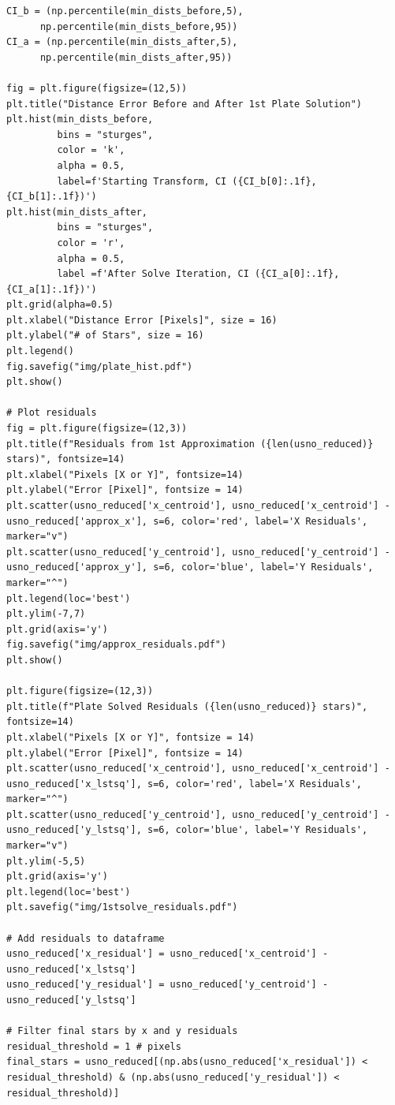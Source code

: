 \documentclass{article}
\begin{document}
\begin{appendices}
\begin{small}
\begin{verbatim}
CI_b = (np.percentile(min_dists_before,5), 
      np.percentile(min_dists_before,95))
CI_a = (np.percentile(min_dists_after,5), 
      np.percentile(min_dists_after,95))

fig = plt.figure(figsize=(12,5))
plt.title("Distance Error Before and After 1st Plate Solution")
plt.hist(min_dists_before, 
         bins = "sturges", 
         color = 'k',
         alpha = 0.5, 
         label=f'Starting Transform, CI ({CI_b[0]:.1f},{CI_b[1]:.1f})')
plt.hist(min_dists_after, 
         bins = "sturges", 
         color = 'r',
         alpha = 0.5, 
         label =f'After Solve Iteration, CI ({CI_a[0]:.1f},{CI_a[1]:.1f})')
plt.grid(alpha=0.5)
plt.xlabel("Distance Error [Pixels]", size = 16)
plt.ylabel("# of Stars", size = 16)
plt.legend()
fig.savefig("img/plate_hist.pdf")
plt.show()

# Plot residuals
fig = plt.figure(figsize=(12,3))
plt.title(f"Residuals from 1st Approximation ({len(usno_reduced)} stars)", fontsize=14)
plt.xlabel("Pixels [X or Y]", fontsize=14)
plt.ylabel("Error [Pixel]", fontsize = 14)
plt.scatter(usno_reduced['x_centroid'], usno_reduced['x_centroid'] - usno_reduced['approx_x'], s=6, color='red', label='X Residuals', marker="v")
plt.scatter(usno_reduced['y_centroid'], usno_reduced['y_centroid'] - usno_reduced['approx_y'], s=6, color='blue', label='Y Residuals', marker="^")
plt.legend(loc='best')
plt.ylim(-7,7)
plt.grid(axis='y')
fig.savefig("img/approx_residuals.pdf")
plt.show()

plt.figure(figsize=(12,3))
plt.title(f"Plate Solved Residuals ({len(usno_reduced)} stars)", fontsize=14)
plt.xlabel("Pixels [X or Y]", fontsize = 14)
plt.ylabel("Error [Pixel]", fontsize = 14)
plt.scatter(usno_reduced['x_centroid'], usno_reduced['x_centroid'] - usno_reduced['x_lstsq'], s=6, color='red', label='X Residuals', marker="^")
plt.scatter(usno_reduced['y_centroid'], usno_reduced['y_centroid'] - usno_reduced['y_lstsq'], s=6, color='blue', label='Y Residuals', marker="v")
plt.ylim(-5,5)
plt.grid(axis='y')
plt.legend(loc='best')
plt.savefig("img/1stsolve_residuals.pdf")

# Add residuals to dataframe
usno_reduced['x_residual'] = usno_reduced['x_centroid'] - usno_reduced['x_lstsq']
usno_reduced['y_residual'] = usno_reduced['y_centroid'] - usno_reduced['y_lstsq']

# Filter final stars by x and y residuals
residual_threshold = 1 # pixels
final_stars = usno_reduced[(np.abs(usno_reduced['x_residual']) < residual_threshold) & (np.abs(usno_reduced['y_residual']) < residual_threshold)]
\end{verbatim}
\end{small}


\end{appendices}
\end{document}
